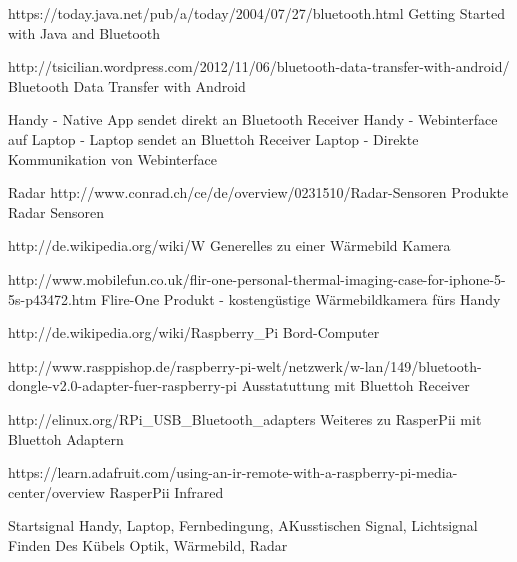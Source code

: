 https://today.java.net/pub/a/today/2004/07/27/bluetooth.html
Getting Started with Java and Bluetooth

http://tsicilian.wordpress.com/2012/11/06/bluetooth-data-transfer-with-android/
Bluetooth Data Transfer with Android

Handy - Native App sendet direkt an Bluetooth Receiver
Handy - Webinterface auf Laptop - Laptop sendet an Bluettoh Receiver
Laptop - Direkte Kommunikation von Webinterface


Radar
http://www.conrad.ch/ce/de/overview/0231510/Radar-Sensoren
Produkte Radar Sensoren

http://de.wikipedia.org/wiki/W%
Generelles zu einer Wärmebild Kamera

http://www.mobilefun.co.uk/flir-one-personal-thermal-imaging-case-for-iphone-5-5s-p43472.htm
Flire-One Produkt - kostengüstige Wärmebildkamera fürs Handy


http://de.wikipedia.org/wiki/Raspberry_Pi
Bord-Computer

http://www.rasppishop.de/raspberry-pi-welt/netzwerk/w-lan/149/bluetooth-dongle-v2.0-adapter-fuer-raspberry-pi
Ausstatuttung mit Bluettoh Receiver

http://elinux.org/RPi_USB_Bluetooth_adapters
Weiteres zu RasperPii mit Bluettoh Adaptern

https://learn.adafruit.com/using-an-ir-remote-with-a-raspberry-pi-media-center/overview
RasperPii Infrared

Startsignal
Handy, Laptop, Fernbedingung, AKusstischen Signal, Lichtsignal
Finden Des Kübels
Optik, Wärmebild, Radar
